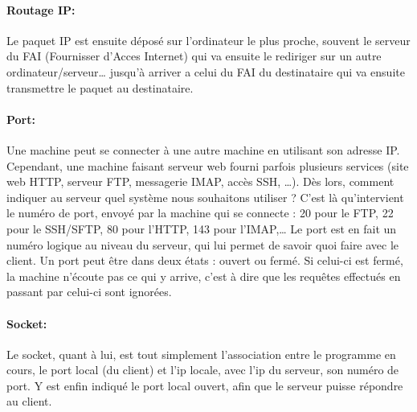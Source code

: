 \documentclass[12pt,a4paper,twoside]{article}
\begin{document}
    \paragraph*{Routage IP:\\}
    Le paquet IP est ensuite déposé sur l'ordinateur le plus proche, souvent le serveur du FAI (Fournisser d'Acces Internet) qui va ensuite le rediriger sur un autre ordinateur/serveur\ldots{} jusqu'à arriver a celui du FAI du destinataire qui va ensuite transmettre le paquet au destinataire.

    \paragraph*{Port:\\}
    Une machine peut se connecter à une autre machine en utilisant son adresse IP. Cependant, une machine faisant serveur web fourni parfois plusieurs services (site web HTTP, serveur FTP, messagerie IMAP, accès SSH, …). Dès lors, comment indiquer au serveur quel système nous souhaitons utiliser ? C'est là qu'intervient le numéro de port, envoyé par la machine qui se connecte : 20 pour le FTP, 22 pour le SSH/SFTP, 80 pour l'HTTP, 143 pour l'IMAP,\ldots{} Le port est en fait un numéro logique au niveau du serveur, qui lui permet de savoir quoi faire avec le client. Un port peut être dans deux états : ouvert ou fermé. Si celui-ci est fermé, la machine n'écoute pas ce qui y arrive, c'est à dire que les requêtes effectués en passant par celui-ci sont ignorées.

    \paragraph*{Socket:\\}
    Le socket, quant à lui, est tout simplement l'association entre le programme en cours, le port local (du client) et l'ip locale, avec l'ip du serveur, son numéro de port. Y est enfin indiqué le port local ouvert, afin que le serveur puisse répondre au client.
\end{document}
